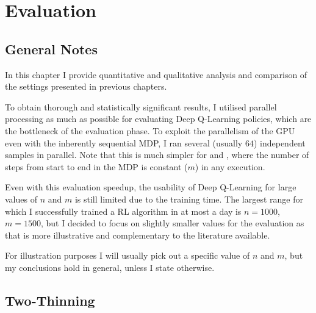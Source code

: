 \chapter{Evaluation}\label{evaluation}


\ifpdf
    \graphicspath{{Chapter3/Figs/Raster/}{Chapter3/Figs/PDF/}{Chapter3/Figs/}}
\else
    \graphicspath{{Chapter3/Figs/Vector/}{Chapter3/Figs/}}
\fi



\section{General Notes}

In this chapter I provide quantitative and qualitative analysis and comparison of the settings presented in previous chapters.


To obtain thorough and statistically significant results, I utilised parallel processing as much as possible for evaluating Deep Q-Learning policies, which are the bottleneck of the evaluation phase. To exploit the parallelism of the GPU even with the inherently sequential MDP, I ran several (usually $64$) independent samples in parallel. Note that this is much simpler for \TwoThinning and \GraphicalTwoChoice, where the number of steps from start to end in the MDP is constant ($m$) in any execution.


Even with this evaluation speedup, the usability of Deep Q-Learning for large values of $n$ and $m$ is still limited due to the training time. The largest range for which I successfully trained a RL algorithm in at most a day is $n=1000$, $m=1500$, but I decided to focus on slightly smaller values for the evaluation as that is more illustrative and complementary to the literature available.


For illustration purposes I will usually pick out a specific value of $n$ and $m$, but my conclusions hold in general, unless I state otherwise.



\section{Two-Thinning}


